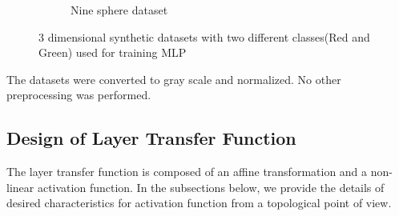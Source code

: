 \documentclass{bmvc2k}
\begin{document}
\begin{figure}
\begin{subfigure}[t]{.45\textwidth}
  \caption{Nine sphere dataset}
  \label{nine_sphere_dataset}
\end{subfigure}
\vspace{.2in}
\caption{3 dimensional synthetic datasets with two different classes(Red and Green) used for training MLP}
\label{synthetic_dataset}
\end{figure}


The datasets were converted to gray scale and normalized. No other preprocessing was performed.
\subsection{Design of Layer Transfer Function}
\label{activation_function_design}
The layer transfer function is composed of an affine transformation and a non-linear activation function. In the subsections below, we provide the details of desired characteristics for activation function from a topological point of view.
\end{document}
